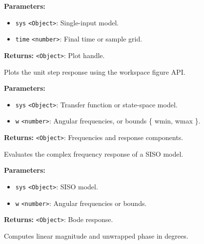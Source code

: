 \documentclass[12pt,a4paper]{article}
\begin{document}
\vspace{5mm}
\noindent {}


\noindent \textbf{Parameters:}
\begin{itemize}
  \item \texttt{sys} \texttt{<Object>}: Single-input model.
  \item \texttt{time} \texttt{<number>}: Final time or sample grid.
\end{itemize}

\noindent \textbf{Returns:} \texttt{<Object>}: Plot handle.

\noindent Plots the unit step response using the workspace figure API.

\vspace{5mm}
\noindent {}


\noindent \textbf{Parameters:}
\begin{itemize}
  \item \texttt{sys} \texttt{<Object>}: Transfer function or state-space model.
  \item \texttt{w} \texttt{<number>}: Angular frequencies, or bounds \{ wmin, wmax \}.
\end{itemize}

\noindent \textbf{Returns:} \texttt{<Object>}: Frequencies and response components.

\noindent Evaluates the complex frequency response of a SISO model.

\vspace{5mm}
\noindent {}


\noindent \textbf{Parameters:}
\begin{itemize}
  \item \texttt{sys} \texttt{<Object>}: SISO model.
  \item \texttt{w} \texttt{<number>}: Angular frequencies or bounds.
\end{itemize}

\noindent \textbf{Returns:} \texttt{<Object>}: Bode response.

\noindent Computes linear magnitude and unwrapped phase in degrees.
\end{document}

